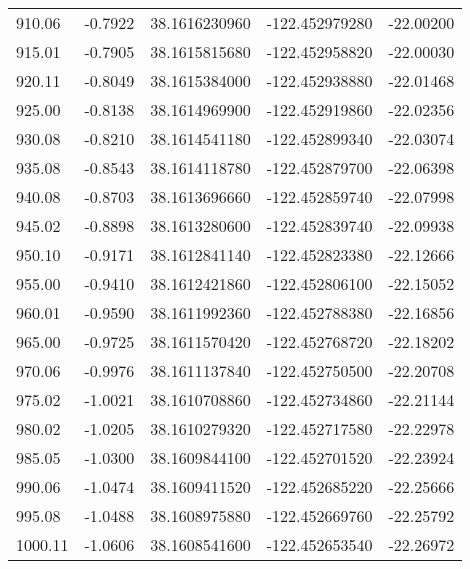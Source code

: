 \begin{scriptsize}
\begin{longtable}{p{2.5cm}p{2.5cm}p{3cm}p{3cm}p{2.5cm}}
           910.06  & 	-0.7922 &               38.1616230960  &   -122.452979280   &	-22.00200 \\
           915.01  & 	-0.7905 &               38.1615815680  &   -122.452958820   &	-22.00030 \\
           920.11  & 	-0.8049 &               38.1615384000  &   -122.452938880   &	-22.01468 \\
           925.00  & 	-0.8138 &               38.1614969900  &   -122.452919860   &	-22.02356 \\
           930.08  & 	-0.8210 &               38.1614541180  &   -122.452899340   &	-22.03074 \\
           935.08  & 	-0.8543 &               38.1614118780  &   -122.452879700   &	-22.06398 \\
           940.08  & 	-0.8703 &               38.1613696660  &   -122.452859740   &	-22.07998 \\
           945.02  & 	-0.8898 &               38.1613280600  &   -122.452839740   &	-22.09938 \\
           950.10  & 	-0.9171 &               38.1612841140  &   -122.452823380   &	-22.12666 \\
           955.00  & 	-0.9410 &               38.1612421860  &   -122.452806100	&   -22.15052 \\
           960.01  & 	-0.9590 &               38.1611992360  &   -122.452788380	&   -22.16856 \\
           965.00  & 	-0.9725 &               38.1611570420  &   -122.452768720	&   -22.18202 \\
           970.06  & 	-0.9976 &               38.1611137840  &   -122.452750500	&   -22.20708 \\
           975.02  & 	-1.0021 &               38.1610708860  &   -122.452734860   &	-22.21144 \\
           980.02  & 	-1.0205 &               38.1610279320  &   -122.452717580   &	-22.22978 \\
           985.05  & 	-1.0300 &               38.1609844100  &   -122.452701520   &	-22.23924 \\
           990.06  & 	-1.0474 &               38.1609411520  &   -122.452685220   &	-22.25666 \\
           995.08  & 	-1.0488 &               38.1608975880  &   -122.452669760   &	-22.25792 \\
          1000.11  & 	-1.0606 &               38.1608541600  &   -122.452653540   &	-22.26972 \\

\end{longtable}
\end{scriptsize}
